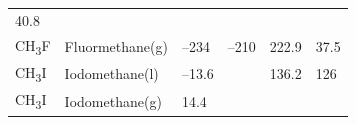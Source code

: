 \documentclass[
  9pt,
]{extbook}
\theoremstyle{definition}
\theoremstyle{definition}
\theoremstyle{definition}
\theoremstyle{remark}
\begin{document}
\begin{longtable}[]{@{}llllll@{}}
\begin{minipage}[t]{0.14\columnwidth}
40.8\strut
\end{minipage}\tabularnewline
\begin{minipage}[t]{0.07\columnwidth}\raggedright
CH\textsubscript{3}F\strut
\end{minipage} & \begin{minipage}[t]{0.17\columnwidth}\raggedright
Fluormethane(g)\strut
\end{minipage} & \begin{minipage}[t]{0.15\columnwidth}\raggedright
--234\strut
\end{minipage} & \begin{minipage}[t]{0.15\columnwidth}\raggedright
--210\strut
\end{minipage} & \begin{minipage}[t]{0.14\columnwidth}\raggedright
222.9\strut
\end{minipage} & \begin{minipage}[t]{0.14\columnwidth}\raggedright
37.5\strut
\end{minipage}\tabularnewline
\begin{minipage}[t]{0.07\columnwidth}\raggedright
CH\textsubscript{3}I\strut
\end{minipage} & \begin{minipage}[t]{0.17\columnwidth}\raggedright
Iodomethane(l)\strut
\end{minipage} & \begin{minipage}[t]{0.15\columnwidth}\raggedright
--13.6\strut
\end{minipage} & \begin{minipage}[t]{0.15\columnwidth}\raggedright
\strut
\end{minipage} & \begin{minipage}[t]{0.14\columnwidth}\raggedright
136.2\strut
\end{minipage} & \begin{minipage}[t]{0.14\columnwidth}\raggedright
126\strut
\end{minipage}\tabularnewline
\begin{minipage}[t]{0.07\columnwidth}\raggedright
CH\textsubscript{3}I\strut
\end{minipage} & \begin{minipage}[t]{0.17\columnwidth}\raggedright
Iodomethane(g)\strut
\end{minipage} & \begin{minipage}[t]{0.15\columnwidth}\raggedright
14.4\strut
\end{minipage} & \begin{minipage}[t]{0.15\columnwidth}\raggedright

\end{minipage}
\end{longtable}
\end{document}
